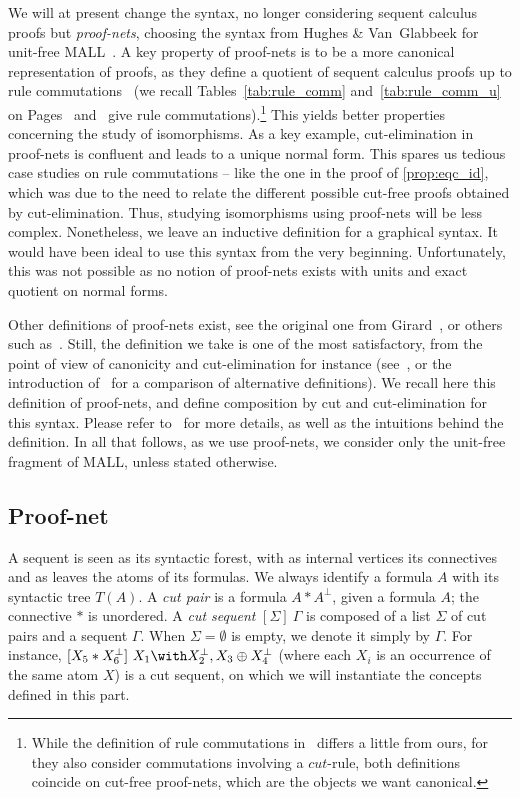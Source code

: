 \documentclass{lmcs}
\newcommand*{\orth}{^\perp} %
\begin{document}
We will at present change the syntax, no longer considering sequent calculus proofs but \emph{proof-nets}, choosing the syntax from Hughes \& Van~Glabbeek for unit-free MALL~\cite{mallpnlong}.
A key property of proof-nets is to be a more canonical representation of proofs, as they define a quotient of sequent calculus proofs up to rule commutations~\cite{mallpncom} (we recall Tables~\ref{tab:rule_comm} and~\ref{tab:rule_comm_u} on Pages~\pageref{tab:rule_comm} and~\pageref{tab:rule_comm_u} give rule commutations).\footnote{While the definition of rule commutations in~\cite{mallpncom} differs a little from ours, for they also consider commutations involving a $cut$-rule, both definitions coincide on cut-free proof-nets, which are the objects we want canonical.}
This yields better properties concerning the study of isomorphisms.
As a key example, cut-elimination in proof-nets is confluent and leads to a unique normal form.
This spares us tedious case studies on rule commutations -- like the one in the proof of \autoref{prop:eqc_id}, which was due to the need to relate the different possible cut-free proofs obtained by cut-elimination.
Thus, studying isomorphisms using proof-nets will be less complex.
Nonetheless, we leave an inductive definition for a graphical syntax.
It would have been ideal to use this syntax from the very beginning.
Unfortunately, this was not possible as no notion of proof-nets exists with units and exact quotient on normal forms.

Other definitions of proof-nets exist, see the original one from Girard~\cite{pn}, or others such as~\cite{jumpadd,conflictnet}. Still, the definition we take is one of the most satisfactory, from the point of view of canonicity and cut-elimination for instance (see~\cite{mallpnlong,mallpncom}, or the introduction of~\cite{conflictnet} for a comparison of alternative definitions).
We recall here this definition of proof-nets, and define composition by cut and cut-elimination for this syntax.
Please refer to~\cite{mallpnlong} for more details, as well as the intuitions behind the definition.
In all that follows, as we use proof-nets, we consider only the unit-free fragment of MALL, unless stated otherwise.

\subsection{Proof-net}
\label{sec:def_pn}

A sequent is seen as its syntactic forest, with as internal vertices its connectives and as leaves the atoms of its formulas.
We always identify a formula $A$ with its syntactic tree $T(A)$.
A \emph{cut pair} is a formula $A\ast A\orth$, given a formula $A$; the connective $\ast$ is unordered.
A \emph{cut sequent} $[\Sigma]~\Gamma$ is composed of a list $\Sigma$ of cut pairs and a sequent $\Gamma$. When $\Sigma=\emptyset$ is empty, we denote it simply by $\Gamma$.
For instance, $[X_5\ast X_6\orth]~X_1\with X_2\orth, X_3\oplus X_4\orth$ (where each $X_i$ is an occurrence of the same atom $X$) is a cut sequent, on which we will instantiate the concepts defined in this part.
\end{document}
